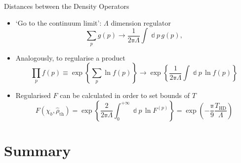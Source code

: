 \documentclass{beamer}
\newcommand{\pp}{{\Bbbpi}}
\newcommand{\rbr}[1]{{\left(#1\right)}}
\newcommand{\rfun}[2]{{#1}\mathopen{}\left(#2\right)\mathclose{}}
\newcommand{\cfun}[2]{{#1}\mathopen{}\left\{#2\right\}\mathclose{}}
\newcommand{\dd}{\Bbbd}
\newcommand{\what}[1]{{\widehat{#1}}}
\begin{document}
\begin{frame}{Distances between the Density Operators}{}
{\begin{itemize}
\item `Go to the continuum limit': $\Lambda$ dimension regulator
\begin{equation}
\sum_p \rfun{g}{p} \to \frac{1}{2\pp\Lambda} \int \dd p\,\rfun{g}{p},
\end{equation}

\item Analogously, to regularise a product
\begin{equation}
\prod_p \rfun{f}{p} \equiv \cfun{\exp}{\sum_p 
\ln\rfun{f}{p}} \to \cfun{\exp}{\frac{1}{2\pp\Lambda}
\int \dd p\,\ln\rfun{f}{p}}
\end{equation}

\item Regularised $F$ can be calculated \alert{in order to set bounds of $T$}
\begin{equation}
\rfun{F}{\chi_b, \what{\rho}_\text{th}} = 
\cfun{\exp}{\frac{2}{2\pp\Lambda}\int_0^{+\infty}\dd p\,\ln F^{\rbr{p}}} =
\rfun{\exp}{-\frac{\pp}{9} \frac{T_\text{HD}}{\Lambda}}
\end{equation}
\end{itemize}}


\end{frame}



\section*{Summary}
\end{document}
